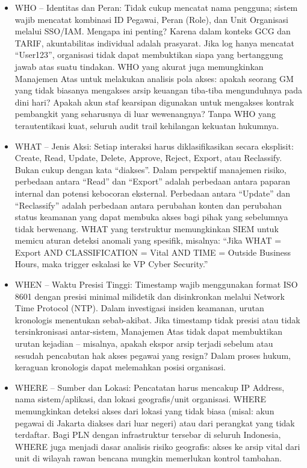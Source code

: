 \documentclass[12pt,a4paper]{report}
\begin{document}
\begin{itemize}[leftmargin=*]
    \item WHO -- Identitas dan Peran: Tidak cukup mencatat nama pengguna; sistem wajib mencatat kombinasi ID Pegawai, Peran (Role), dan Unit Organisasi melalui SSO/IAM. Mengapa ini penting? Karena dalam konteks GCG dan TARIF, akuntabilitas individual adalah prasyarat. Jika log hanya mencatat ``User123'', organisasi tidak dapat membuktikan siapa yang bertanggung jawab atas suatu tindakan. WHO yang akurat juga memungkinkan Manajemen Atas untuk melakukan analisis pola akses: apakah seorang GM yang tidak biasanya mengakses arsip keuangan tiba-tiba mengunduhnya pada dini hari? Apakah akun staf kearsipan digunakan untuk mengakses kontrak pembangkit yang seharusnya di luar wewenangnya? Tanpa WHO yang terautentikasi kuat, seluruh audit trail kehilangan kekuatan hukumnya.

    \item WHAT -- Jenis Aksi: Setiap interaksi harus diklasifikasikan secara eksplisit: Create, Read, Update, Delete, Approve, Reject, Export, atau Reclassify. Bukan cukup dengan kata ``diakses''. Dalam perspektif manajemen risiko, perbedaan antara ``Read'' dan ``Export'' adalah perbedaan antara paparan internal dan potensi kebocoran eksternal. Perbedaan antara ``Update'' dan ``Reclassify'' adalah perbedaan antara perubahan konten dan perubahan status keamanan yang dapat membuka akses bagi pihak yang sebelumnya tidak berwenang. WHAT yang terstruktur memungkinkan SIEM untuk memicu aturan deteksi anomali yang spesifik, misalnya: ``Jika WHAT = Export AND CLASSIFICATION = Vital AND TIME = Outside Business Hours, maka trigger eskalasi ke VP Cyber Security.''

    \item WHEN -- Waktu Presisi Tinggi: Timestamp wajib menggunakan format ISO 8601 dengan presisi minimal milidetik dan disinkronkan melalui Network Time Protocol (NTP). Dalam investigasi insiden keamanan, urutan kronologis menentukan sebab-akibat. Jika timestamp tidak presisi atau tidak tersinkronisasi antar-sistem, Manajemen Atas tidak dapat membuktikan urutan kejadian -- misalnya, apakah ekspor arsip terjadi sebelum atau sesudah pencabutan hak akses pegawai yang resign? Dalam proses hukum, keraguan kronologis dapat melemahkan posisi organisasi.

    \item WHERE -- Sumber dan Lokasi: Pencatatan harus mencakup IP Address, nama sistem/aplikasi, dan lokasi geografis/unit organisasi. WHERE memungkinkan deteksi akses dari lokasi yang tidak biasa (misal: akun pegawai di Jakarta diakses dari luar negeri) atau dari perangkat yang tidak terdaftar. Bagi PLN dengan infrastruktur tersebar di seluruh Indonesia, WHERE juga menjadi dasar analisis risiko geografis: akses ke arsip vital dari unit di wilayah rawan bencana mungkin memerlukan kontrol tambahan.
\end{itemize}
\end{document}
